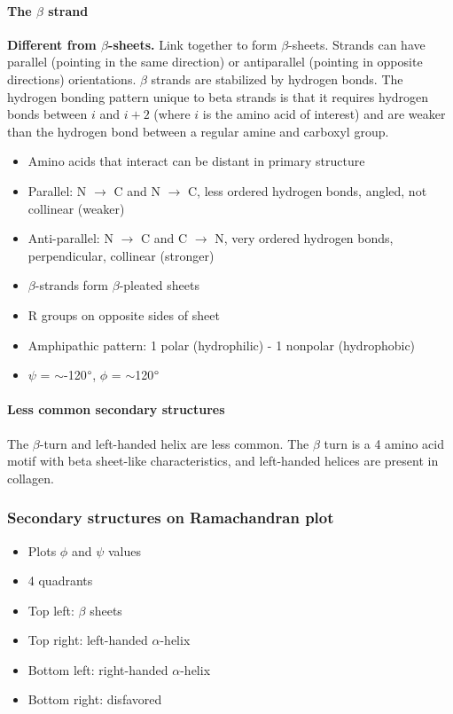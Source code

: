 \documentclass[letterpaper, 12pt]{article}
\begin{document}
\paragraph{The $\beta$ strand} \textbf{Different from $\beta$-sheets.} Link together to form $\beta$-sheets. Strands can have parallel (pointing in the same direction) or antiparallel (pointing in opposite directions) orientations. $\beta$ strands are stabilized by hydrogen bonds. The hydrogen bonding pattern unique to beta strands is that it requires hydrogen bonds between $i$ and $i+2$ (where $i$ is the amino acid of interest) and are weaker than the hydrogen bond between a regular amine and carboxyl group.

\begin{itemize}
\item Amino acids that interact can be distant in primary structure
\item Parallel: N $\to$ C and N $\to$ C, less ordered hydrogen bonds, angled, not collinear (weaker)
\item Anti-parallel: N $\to$ C and C $\to$ N, very ordered hydrogen bonds, perpendicular, collinear (stronger)
\item $\beta$-strands form $\beta$-pleated sheets
\item R groups on opposite sides of sheet
\item Amphipathic pattern: 1 polar (hydrophilic) - 1 nonpolar (hydrophobic)
\item $\psi$ = $\sim$-120$\degree$, $\phi$ = $\sim$120$\degree$
\end{itemize}

\paragraph{Less common secondary structures} The $\beta$-turn and left-handed helix are less common. The $\beta$ turn is a 4 amino acid motif with beta sheet-like characteristics, and left-handed helices are present in collagen.

\subsubsection*{Secondary structures on Ramachandran plot}

\begin{itemize}
\item Plots $\phi$ and $\psi$ values
\item 4 quadrants
\item Top left: $\beta$ sheets
\item Top right: left-handed $\alpha$-helix
\item Bottom left: right-handed $\alpha$-helix
\item Bottom right: disfavored
\end{itemize}
\end{document}
